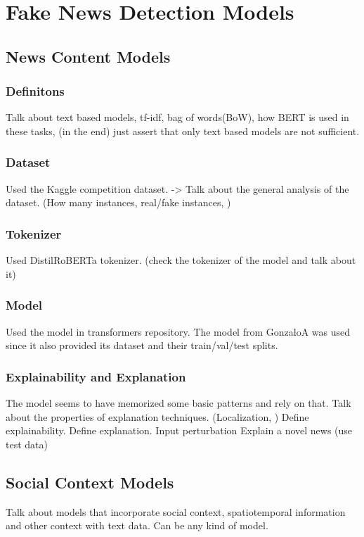 
\chapter{Fake News Detection Models}\label{chapter:fnd_models}

\section{News Content Models}

\subsection{Definitons}
Talk about text based models, tf-idf, bag of words(BoW), how BERT is used in these tasks, (in the end) just assert that only text based models are not sufficient.

\subsection{Dataset}
Used the Kaggle competition dataset.
-> Talk about the general analysis of the dataset. (How many instances, real/fake instances, )

\subsection{Tokenizer}
Used DistilRoBERTa tokenizer. (check the tokenizer of the model and talk about it)

\subsection{Model}
Used the model in transformers repository. The model from GonzaloA was used since it also provided its dataset and their train/val/test splits.

\subsection{Explainability and Explanation}
The model seems to have memorized some basic patterns and rely on that.
Talk about the properties of explanation techniques. (Localization, )
Define explainability. Define explanation.
Input perturbation
Explain a novel news (use test data)

\section{Social Context Models}
Talk about models that incorporate social context, spatiotemporal information and other context with text data. Can be any kind of model.

